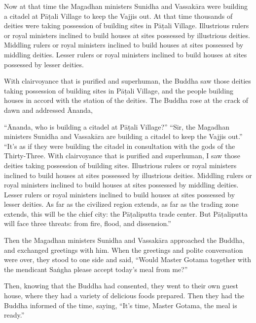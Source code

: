 \documentclass[12pt,openany]{book}%
\begin{document}
Now at that time the Magadhan ministers Sunidha and \textsanskrit{Vassakāra} were building a citadel at \textsanskrit{Pāṭali} Village to keep the Vajjis out. At that time thousands of deities were taking possession of building sites in \textsanskrit{Pāṭali} Village. Illustrious rulers or royal ministers inclined to build houses at sites possessed by illustrious deities. Middling rulers or royal ministers inclined to build houses at sites possessed by middling deities. Lesser rulers or royal ministers inclined to build houses at sites possessed by lesser deities. 

With clairvoyance that is purified and superhuman, the Buddha saw those deities taking possession of building sites in \textsanskrit{Pāṭali} Village, and the people building houses in accord with the station of the deities. The Buddha rose at the crack of dawn and addressed Ānanda, 

“Ānanda, who is building a citadel at \textsanskrit{Pāṭali} Village?” “Sir, the Magadhan ministers Sunidha and \textsanskrit{Vassakāra} are building a citadel to keep the Vajjis out.” “It’s as if they were building the citadel in consultation with the gods of the Thirty-Three. With clairvoyance that is purified and superhuman, I saw those deities taking possession of building sites. Illustrious rulers or royal ministers inclined to build houses at sites possessed by illustrious deities. Middling rulers or royal ministers inclined to build houses at sites possessed by middling deities. Lesser rulers or royal ministers inclined to build houses at sites possessed by lesser deities. As far as the civilized region extends, as far as the trading zone extends, this will be the chief city: the \textsanskrit{Pāṭaliputta} trade center. But \textsanskrit{Pāṭaliputta} will face three threats: from fire, flood, and dissension.” 

Then the Magadhan ministers Sunidha and \textsanskrit{Vassakāra} approached the Buddha, and exchanged greetings with him. When the greetings and polite conversation were over, they stood to one side and said, “Would Master Gotama together with the mendicant \textsanskrit{Saṅgha} please accept today’s meal from me?” 

Then, knowing that the Buddha had consented, they went to their own guest house, where they had a variety of delicious foods prepared. Then they had the Buddha informed of the time, saying, “It’s time, Master Gotama, the meal is ready.” 
\end{document}

